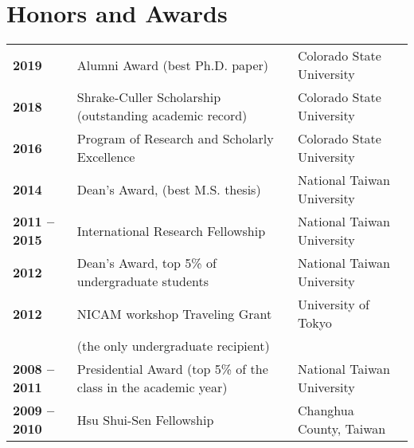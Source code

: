 \documentclass{article}
\begin{document}
\section{\color{airforceblue}Honors and Awards}
\begin{tabular}{>{\bfseries}p{2.5cm}p{10cm}p{\linewidth-2.5cm\relax}}
     2019   & Alumni Award (best Ph.D. paper) & Colorado State University 
     \\
     2018   & Shrake-Culler Scholarship (outstanding academic record) & Colorado State University 
     \\  
	 2016   & Program of Research and Scholarly Excellence & Colorado State University 
	 \\
     2014  & Dean’s Award, (best M.S. thesis) & National Taiwan University 
     \\
     2011 -- 2015 & International Research Fellowship & National Taiwan University 
     \\
     2012        & Dean’s Award, top 5\% of undergraduate students & National Taiwan University  
     \\
     2012        & NICAM workshop Traveling Grant  & University of Tokyo
     \\
                  & (the only undergraduate recipient)                                            &  \\  
     2008 -- 2011 & Presidential Award (top 5\% of the class in the academic year) & National Taiwan University 
     \\

     2009 -- 2010 & Hsu Shui-Sen Fellowship   & Changhua County, Taiwan 
     
\end{tabular}
\end{document}
